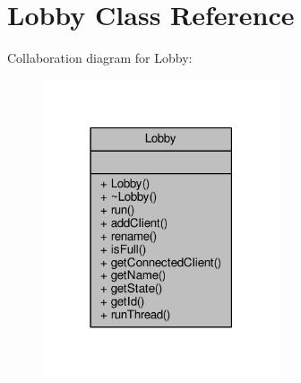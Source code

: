 \hypertarget{class_lobby}{}\section{Lobby Class Reference}
\label{class_lobby}


Collaboration diagram for Lobby\+:\nopagebreak
\begin{figure}[H]
\begin{center}
\leavevmode
\includegraphics[width=198pt]{db/df6/class_lobby__coll__graph}
\end{center}
\end{figure}
